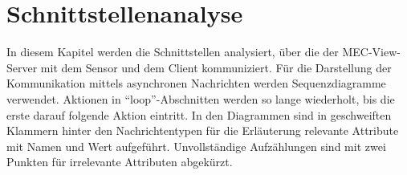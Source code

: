 %		
%		
%		


\section{Schnittstellenanalyse}

In diesem Kapitel werden die Schnittstellen analysiert, über die der MEC-View-Server mit dem Sensor und dem Client kommuniziert.
Für die Darstellung der Kommunikation mittels asynchronen Nachrichten werden Sequenzdiagramme verwendet.
Aktionen in \enquote{loop}-Abschnitten werden so lange wiederholt, bis die erste darauf folgende Aktion eintritt.
In den Diagrammen sind in geschweiften Klammern hinter den Nachrichtentypen für die Erläuterung relevante Attribute mit Namen und Wert aufgeführt.
Unvollständige Aufzählungen sind mit zwei Punkten für irrelevante Attributen abgekürzt.


